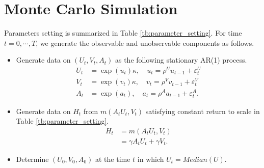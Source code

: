 \documentclass[12pt]{article}
\begin{document}
\section{Monte Carlo Simulation}
Parameters setting is summarized in Table \ref{tb:parameter_setting}.
For time $t=0,\cdots, T$, we generate the observable and unobservable components as follows.
\begin{itemize}
    \item Generate data on $(U_t,V_t,A_t)$ as the following stationary AR(1) process.
    \begin{align*}
        U_t &= \exp(u_t)\kappa,\quad u_t= \rho^{U} u_{t-1} + \varepsilon_{t}^{U}\\
        V_t &= \exp(v_t)\kappa,\quad v_t= \rho^{V} v_{t-1} + \varepsilon_{t}^{V} \\
        A_t &= \exp(a_t),\quad a_{t}=\rho^{A} a_{t-1} + \varepsilon_{t}^{A}.
    \end{align*}
    \item Generate data on $H_t$ from  $m(A_t U_t,V_t)$ satisfying constant return to scale in Table \ref{tb:parameter_setting}.
    \begin{align*}
        H_t&= m(A_t U_t,V_t)\\
        &=\gamma A_t U_t + \gamma V_t .
    \end{align*}
    \item Determine $(U_0,V_0,A_0)$ at the time $t$ in which $U_t=Median(U)$. 
\end{itemize}
\end{document}
